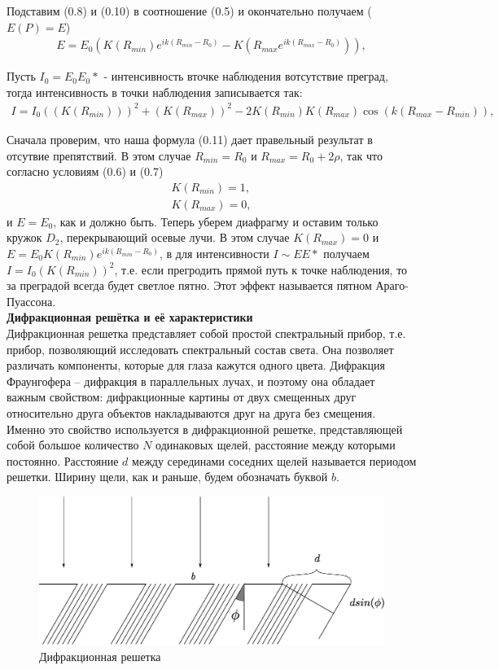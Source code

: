 \documentclass[__main__.tex]{subfiles}
\begin{document}
Подставим (0.8) и (0.10)
в соотношение (0.5)
и окончательно получаем ($E(P)=E$)\\
\begin{gather}
	E = E_0 (K(R_{min})e^{ik(R_{min} - R_0)}-K(R_{max}e^{ik(R_{max} - R_0)})) ,
\end{gather}

Пусть $I_0 = E_0 E_0*$ - интенсивность вточке наблюдения вотсутствие преград, тогда интенсивность в точки наблюдения записывается так:
\begin{gather}
	I = I_0 ((K(R_{min})))^2 +(K(R_{max}))^2 - 2K(R_{min})K(R_{max})\cos(k(R_{max}-R_{min})) ,
\end{gather}

Сначала проверим, что наша формула (0.11)
дает правельный результат в отсутвие препятствий. В этом случае $R_{min} = R_0$ и $R_{max} = R_0 + 2\rho$, так что согласно условиям (0.6) и (0.7)
\begin{gather}
	K(R_{min}) = 1 ,\\
	K(R_{max}) = 0 ,
\end{gather}
и $E = E_0$, как и должно быть.
Теперь уберем диафрагму и оставим только кружок $D_2$, перекрывающий осевые лучи. В этом случае $K(R_{max}) = 0$ и $E=E_0 K(R_{min})e^{ik(R_{min}-R_0)}$, в для интенсивности $I \sim EE*$ получаем $I = I_0 (K(R_{min}))^2$, т.е. если прегродить прямой путь к точке наблюдения, то за преградой всегда будет светлое пятно. Этот эффект называется пятном Араго-Пуассона.\\

\textbf{Дифракционная решётка и её характеристики}\\

Дифракционная решетка представляет собой простой спектральный прибор, т.е. прибор, позволяющий исследовать спектральный состав света. Она позволяет различать компоненты, которые для глаза кажутся одного цвета.
Дифракция Фраунгофера – дифракция в параллельных лучах, и поэтому она обладает важным свойством: дифракционные картины от двух смещенных друг относительно друга объектов накладываются друг на друга без смещения. Именно это свойство используется в дифракционной решетке, представляющей собой большое количество $N$ одинаковых щелей, расстояние между которыми постоянно. Расстояние  $d$  между серединами соседних щелей называется периодом решетки. Ширину щели, как и раньше, будем обозначать буквой $b$.

\begin{figure}[h]
	\begin{center}
		\includegraphics[width=0.5\linewidth]{img/o-07_1.eps}
		\caption{Дифракционная решетка}
	\end{center}
\end{figure}
\end{document}
